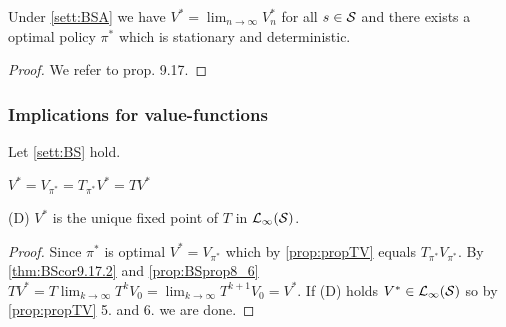 \begin{thm}[Prop. 9.17 BS]
  Under \cref{sett:BSA} we have
  $V^* = \lim_{n \to \infty} V^*_n$ for all $s \in \mathcal{S}$
  and there exists a optimal policy $\pi^*$ which is stationary
  and deterministic.
\end{thm}
\begin{proof}
We refer to  prop. 9.17.
\end{proof}

\subsubsection{Implications for value-functions}
Let \cref{sett:BS} hold.

\begin{prop}
  $V^* = V_{\pi^*} = T_{\pi^*} V^* = T V^*$
  
  (D) $V^*$ is the unique fixed point of $T$ in $\mathcal{L}_\infty(\mathcal{S})$.
  \label{prop:VoptEqVpiOpt}
\end{prop}
\begin{proof}
  Since $\pi^*$ is optimal $V^* = V_{\pi^*}$ which by \cref{prop:propTV}
  equals $T_{\pi^*} V_{\pi^*}$.
  By \cref{thm:BScor9.17.2} and \cref{prop:BSprop8_6}
  $T V^* = T \lim_{k\to\infty} T^k V_0 =
  \lim_{k\to\infty} T^{k+1} V_0 = V^*$.
  If (D) holds $V^* \in \mathcal{L}_\infty(\mathcal{S})$ so by \cref{prop:propTV} 5.
  and 6. we are done.
\end{proof}

